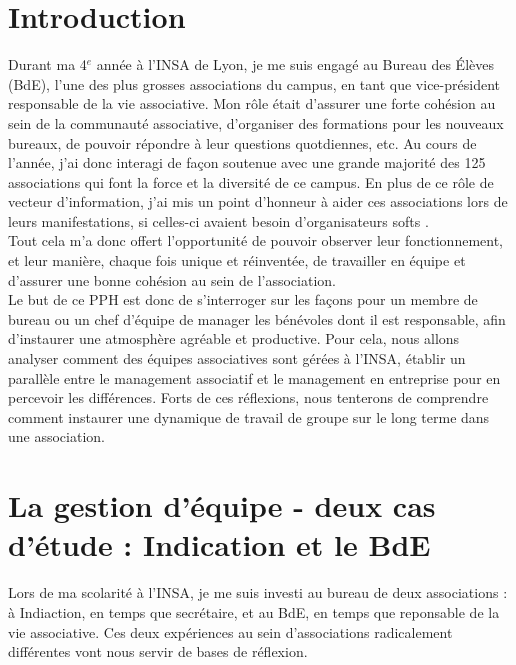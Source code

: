 


\maketitle
\newpage


\section{Introduction}
Durant ma 4$^e$ année à l'INSA de Lyon, je me suis engagé au Bureau des Élèves (BdE), l'une des plus grosses associations du campus, en tant que vice-président responsable de la vie associative. Mon rôle était d'assurer une forte cohésion au sein de la communauté associative, d'organiser des formations pour les nouveaux bureaux, de pouvoir répondre à leur questions quotdiennes, etc. Au cours de l'année, j'ai donc interagi de façon soutenue avec une grande majorité des 125 associations qui font la force et la diversité de ce campus. En plus de ce rôle de vecteur d'information, j'ai mis un point d'honneur à aider ces associations lors de leurs manifestations, si celles-ci avaient besoin d'organisateurs \og softs \fg{}. \\

Tout cela m'a donc offert l'opportunité de pouvoir observer leur fonctionnement, et leur manière, chaque fois unique et réinventée, de travailler en équipe et d'assurer une bonne cohésion au sein de l'association.\\

Le but de ce PPH est donc de s'interroger sur les façons pour un membre de bureau ou un chef d'équipe de \og manager \fg{} les bénévoles dont il est responsable, afin d'instaurer une atmosphère agréable et productive. Pour cela, nous allons analyser comment des équipes associatives sont gérées à l'INSA, établir un parallèle entre le management associatif et le management en entreprise pour en percevoir les différences. Forts de ces réflexions, nous tenterons de comprendre comment instaurer une dynamique de travail de groupe sur le long terme dans une association.

\section{La gestion d'équipe - deux cas d'étude : Indication et le BdE}
Lors de ma scolarité à l'INSA, je me suis investi au bureau de deux associations : à Indiaction, en temps que secrétaire, et au BdE, en temps que reponsable de la vie associative. Ces deux expériences au sein d'associations radicalement différentes vont nous servir de bases de réflexion.\

